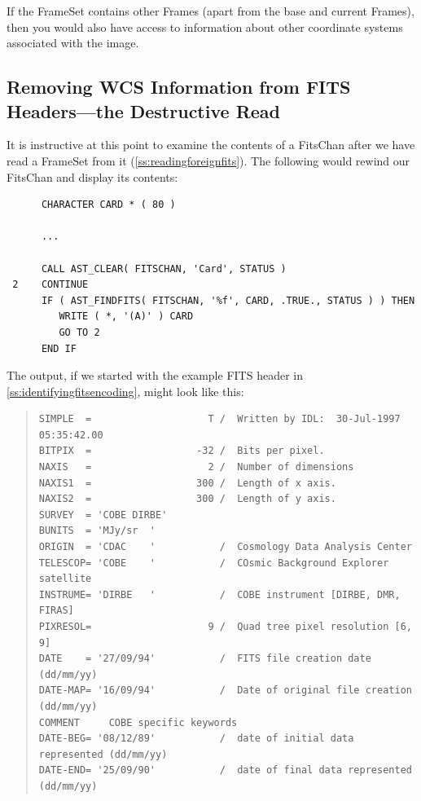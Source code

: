 \documentclass[twoside,11pt]{article}
\newcommand{\htmlref}[2]{#1}
\newcommand{\secref}[1]{\S\ref{#1}}
\renewcommand{\secref}[1]{\ref{#1}}
\begin{document}
If the FrameSet contains other Frames (apart from the base and current
Frames), then you would also have access to information about other
coordinate systems associated with the image.

\subsection{\label{ss:destructiveread}Removing WCS Information from FITS Headers---the Destructive Read}

It is instructive at this point to examine the contents of a \htmlref{FitsChan}{FitsChan}
after we have read a \htmlref{FrameSet}{FrameSet} from it
(\secref{ss:readingforeignfits}). The following would rewind our
FitsChan and display its contents:

\small
\begin{verbatim}
      CHARACTER CARD * ( 80 )

      ...

      CALL AST_CLEAR( FITSCHAN, 'Card', STATUS )
 2    CONTINUE
      IF ( AST_FINDFITS( FITSCHAN, '%f', CARD, .TRUE., STATUS ) ) THEN
         WRITE ( *, '(A)' ) CARD
         GO TO 2
      END IF
\end{verbatim}
\normalsize

The output, if we started with the example FITS header in
\secref{ss:identifyingfitsencoding}, might look like this:

\begin{quote}
\small
\begin{verbatim}
SIMPLE  =                    T /  Written by IDL:  30-Jul-1997 05:35:42.00      
BITPIX  =                  -32 /  Bits per pixel.                               
NAXIS   =                    2 /  Number of dimensions                          
NAXIS1  =                  300 /  Length of x axis.                             
NAXIS2  =                  300 /  Length of y axis.                             
SURVEY  = 'COBE DIRBE'                                                          
BUNITS  = 'MJy/sr  '                                                            
ORIGIN  = 'CDAC    '           /  Cosmology Data Analysis Center                
TELESCOP= 'COBE    '           /  COsmic Background Explorer satellite          
INSTRUME= 'DIRBE   '           /  COBE instrument [DIRBE, DMR, FIRAS]           
PIXRESOL=                    9 /  Quad tree pixel resolution [6, 9]             
DATE    = '27/09/94'           /  FITS file creation date (dd/mm/yy)            
DATE-MAP= '16/09/94'           /  Date of original file creation (dd/mm/yy)     
COMMENT     COBE specific keywords                                              
DATE-BEG= '08/12/89'           /  date of initial data represented (dd/mm/yy)   
DATE-END= '25/09/90'           /  date of final data represented   (dd/mm/yy)   
\end{verbatim}
\normalsize
\end{quote}
\end{document}
